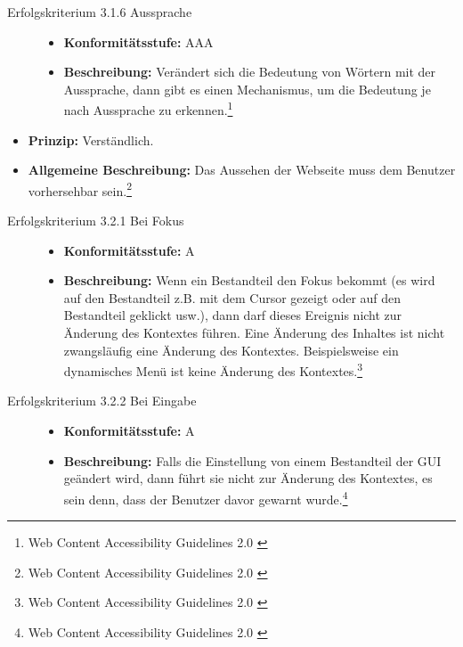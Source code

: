 \begin{description}
\begin{description}
		\item[Erfolgskriterium 3.1.6 Aussprache]\hfill
		\begin{itemize}
			\item \textbf{Konformitätsstufe:} AAA
			\item \textbf{Beschreibung:} Verändert sich die Bedeutung von Wörtern mit der Aussprache, dann gibt es einen Mechanismus, um die Bedeutung je nach Aussprache zu 
			erkennen.\footnote{Web Content Accessibility Guidelines 2.0 \cite{WCAG2.0}}
		\end{itemize}
	\end{description}

	\item[Richtlinie 3.2 Vorhersehbar]\hfill
	\begin{itemize}
		\item \textbf{Prinzip:} Verständlich.
		\item \textbf{Allgemeine Beschreibung:} Das Aussehen der Webseite muss dem Benutzer vorhersehbar sein.\footnote{Web Content Accessibility Guidelines 2.0 \cite{WCAG2.0}}
	\end{itemize}
	
	\begin{description}
		\item[Erfolgskriterium 3.2.1 Bei Fokus]\hfill
		\begin{itemize}
			\item \textbf{Konformitätsstufe:} A
			\item \textbf{Beschreibung:} Wenn ein Bestandteil den Fokus bekommt (es wird auf den Bestandteil z.B. mit dem Cursor gezeigt oder auf den Bestandteil geklickt usw.), dann darf 
			dieses Ereignis nicht zur Änderung des Kontextes führen. Eine Änderung des Inhaltes ist nicht zwangsläufig eine Änderung des Kontextes. Beispielsweise ein dynamisches Menü 
			ist keine Änderung des Kontextes.\footnote{Web Content Accessibility Guidelines 2.0 \cite{WCAG2.0}}
		\end{itemize}
		
		\item[Erfolgskriterium 3.2.2 Bei Eingabe]\hfill
		\begin{itemize}
			\item \textbf{Konformitätsstufe:} A
			\item \textbf{Beschreibung:} Falls die Einstellung von einem Bestandteil der \ac{GUI} geändert wird, dann führt sie nicht zur Änderung des Kontextes, es sein denn, dass 
			der Benutzer davor gewarnt wurde.\footnote{Web Content Accessibility Guidelines 2.0 \cite{WCAG2.0}}
		\end{itemize}
		

\end{description}
\end{description}

